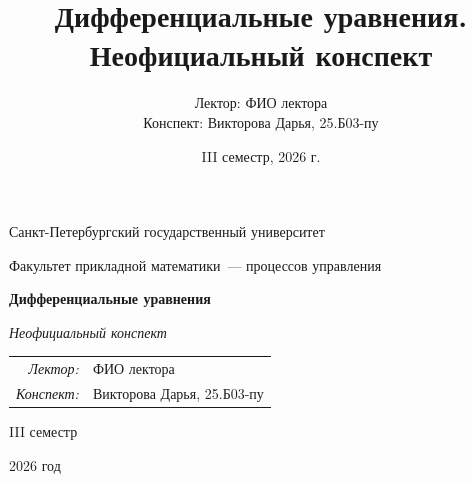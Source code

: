 \documentclass[12pt,a4paper]{report}
\title{Дифференциальные уравнения. Неофициальный конспект}
\author{Лектор: ФИО лектора\\
Конспект: Викторова Дарья, 25.Б03-пу}
\date{III семестр, 2026 г.}
\begin{document}
\begin{titlepage}
    \thispagestyle{empty}
    \begin{center}
        \vspace*{0.6cm}

        {\large Санкт-Петербургский государственный университет\par}
        \vspace{0.35em}
        {\normalsize Факультет прикладной математики~--- процессов управления\par}

        \vspace*{5.1cm}

        {\fontsize{30}{35}\selectfont\bfseries Дифференциальные уравнения\par}
        \vspace{0.65em}
        {\fontsize{17}{21}\selectfont\itshape Неофициальный конспект\par}

        \vspace{2.7cm}

        {\normalsize
        \begin{tabular}{@{}rl@{}}
            \textit{Лектор:} & ФИО лектора \\
            \textit{Конспект:} & Викторова Дарья, 25.Б03-пу
        \end{tabular}\par}

        \vfill

        {\large III семестр\par}
        \vspace{0.22em}
        {\large 2026 год\par}
        \vspace*{0.55cm}
    \end{center}
\end{titlepage}

\tableofcontents
\newpage

\setcounter{lection}{0}

\end{document}

